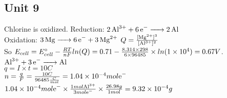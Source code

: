 \documentclass[../main.tex]{subfiles}
\begin{document}
\subsection{Unit 9}
\AnswerSet
Chlorine is oxidized.
\AnswerSet
Reduction: \(\ce{2Al^{3+} + 6e- -> 2Al}\)\\
Oxidation: \(\ce{3Mg -> 6e- + 3Mg^{2+}}\)
\AnswerSet
\(Q = \frac{[\ce{Mg^{2+}}]^3}{[\ce{Al^{3+}}]^2}\)\\
So \(E_{cell} = E_{cell}\degree -\frac{RT}{nF} ln(Q) = 0.71 - \frac{8.314\times 298}{6\times 96485}\times ln(1\times 10^{4}) = 0.67V\).
\AnswerSet
\(\ce{Al^{3+} + 3e- -> Al}\)\\
\(q = I\times t = 10 C\) \\
\(n = \frac{q}{F} = \frac{10C}{96485\frac{C}{mol}} = 1.04\times 10^{-4} mol\ce{e-}\) \\
\(1.04\times 10^{-4}mol\ce{e-}\times \frac{1mol\ce{Al^{3+}}}{3mol\ce{e-}}\times \frac{26.98g}{1mol} = 9.32\times 10^{-4}g\)
\end{document}
